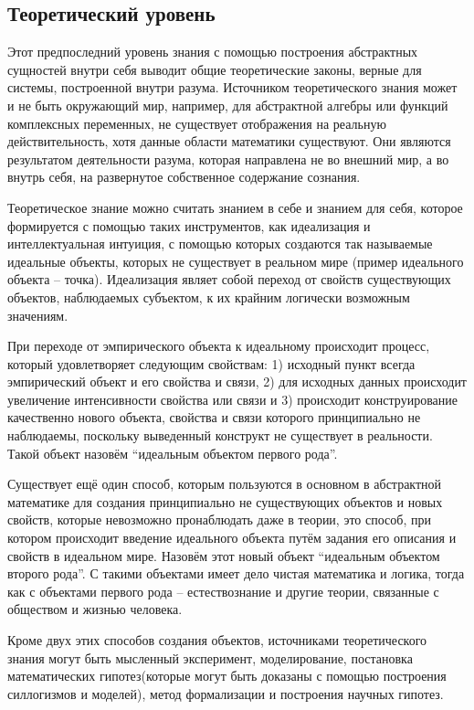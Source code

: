 \documentclass[14pt]{article}
\begin{document}
\subsection{Теоретический уровень}
Этот предпоследний уровень знания с помощью построения абстрактных сущностей внутри себя выводит общие теоретические законы, верные для системы, построенной внутри разума. Источником теоретического знания может и не быть окружающий мир, например, для абстрактной алгебры или функций комплексных переменных, не существует отображения на реальную действительность, хотя данные области математики существуют. Они являются результатом деятельности разума, которая направлена не во внешний мир, а во внутрь себя, на развернутое собственное содержание сознания. 

Теоретическое знание можно считать знанием в себе и знанием для себя, которое формируется с помощью таких инструментов, как идеализация и интеллектуальная интуиция, с помощью которых создаются так называемые идеальные объекты, которых не существует в реальном мире (пример идеального объекта -- точка). Идеализация являет собой переход от свойств существующих объектов, наблюдаемых субъектом, к их крайним логически возможным значениям. 

При переходе от эмпирического объекта к идеальному происходит процесс, который удовлетворяет следующим свойствам: 1) исходный пункт всегда эмпирический объект и его свойства и связи, 2) для исходных данных происходит увеличение интенсивности свойства или связи и 3) происходит конструирование качественно нового объекта, свойства и связи которого принципиально не наблюдаемы, поскольку выведенный конструкт не существует в реальности. Такой объект назовём ``идеальным объектом первого рода''.

Существует ещё один способ, которым пользуются в основном в абстрактной математике для создания принципиально не существующих объектов и новых свойств, которые невозможно пронаблюдать даже в теории, это способ, при котором происходит введение идеального объекта путём задания его описания и свойств в идеальном мире. Назовём этот новый объект ``идеальным объектом второго рода''. С такими объектами имеет дело чистая математика и логика, тогда как с объектами первого рода -- естествознание и другие теории, связанные с обществом и жизнью человека. 

Кроме двух этих способов создания объектов, источниками теоретического знания могут быть мысленный эксперимент, моделирование, постановка математических гипотез(которые могут быть доказаны с помощью построения силлогизмов и моделей), метод формализации и построения научных гипотез.  
  
\end{document}
